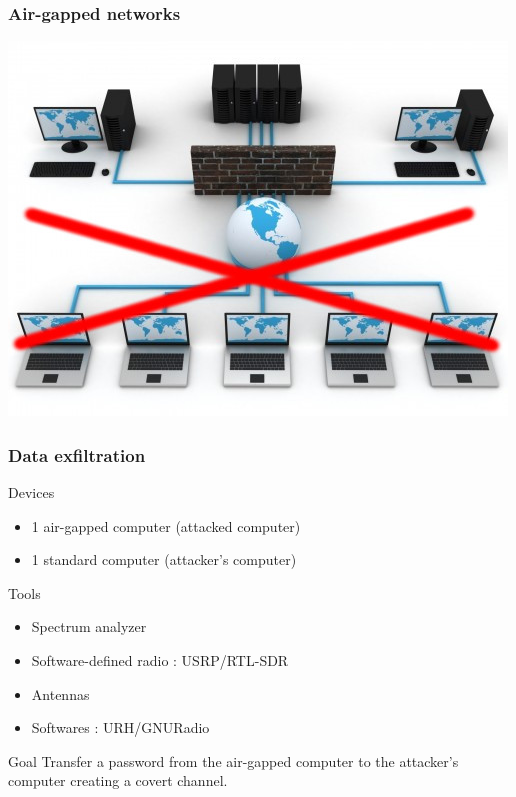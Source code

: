 \begin{frame}
\frametitle{Air-gapped networks}
\centering \includegraphics[scale=.5]{images/network2.jpg}
\end{frame}


\begin{frame}
\frametitle{Data exfiltration}
\begin{block}{Devices}
\begin{itemize}
\item 1 air-gapped computer (attacked computer)
\item 1 standard computer (attacker's computer)
\end{itemize}
\end{block}

\begin{block}{Tools}
\begin{itemize}
\item Spectrum analyzer
\item Software-defined radio : USRP/RTL-SDR
\item Antennas
\item Softwares : URH/GNURadio
\end{itemize}
\end{block}

\begin{block}{Goal}
Transfer a password from the air-gapped computer to the attacker's computer creating a covert channel.
\end{block}

\end{frame}